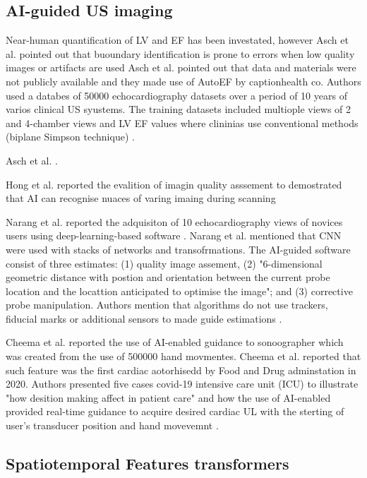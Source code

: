 \subsection{AI-guided US imaging}

Near-human quantification of LV and EF has been investated, however Asch et al. pointed out that buoundary identification is prone to errors when low quality images or artifacts are used
Asch et al. pointed out that data and materials were not publicly available and they made use of AutoEF by captionhealth co.
Authors used a databes of 50000 echocardiography datasets over a period of 10 years of varios clinical US syustems. 
The training datasets included multiople views of 2 and 4-chamber views and LV EF values where clininias use conventional methods (biplane Simpson technique) \cite{asch2019CIRIMAGING}.

Asch et al. \cite{asch2021CircImaging}.

Hong et al. reported the evalition of imagin quality asssement to demostrated that AI can recognise nuaces of varing imaing during scanning \cite{hong2021JACC}


Narang et al. reported the adquisiton of 10 echocardiography views of novices users using deep-learning-based software \cite{Narang2021JAMACARDIOLOGY}.
Narang et al. mentioned that CNN were used with stacks of networks and transofrmations. 
The AI-guided software consist of three estimates: (1) quality image assement, (2) "6-dimensional geometric distance with postion and orientation between the current probe location and the locattion anticipated to optimise the image"; and (3) corrective probe manipulation. \cite{Narang2021JAMACARDIOLOGY}
Authors mention that algorithms do not use trackers, fiducial marks or additional sensors to made guide estimations \cite{Narang2021JAMACARDIOLOGY}.


Cheema et al. reported the use of AI-enabled guidance to sonoographer which was created from the use of 500000 hand movmentes.
Cheema et al.  reported that such feature was the first cardiac aotorhisedd by Food and Drug adminstation in 2020. 
Authors presented five cases covid-19 intensive care unit (ICU) to illustrate "how desition making affect in patient care" and how the use of AI-enabled provided real-time guidance to acquire desired cardiac UL with the sterting of user's transducer position and hand movevemnt \cite{CHEEMA2021JACCCaseReports}.


\subsection{Spatiotemporal Features transformers}

